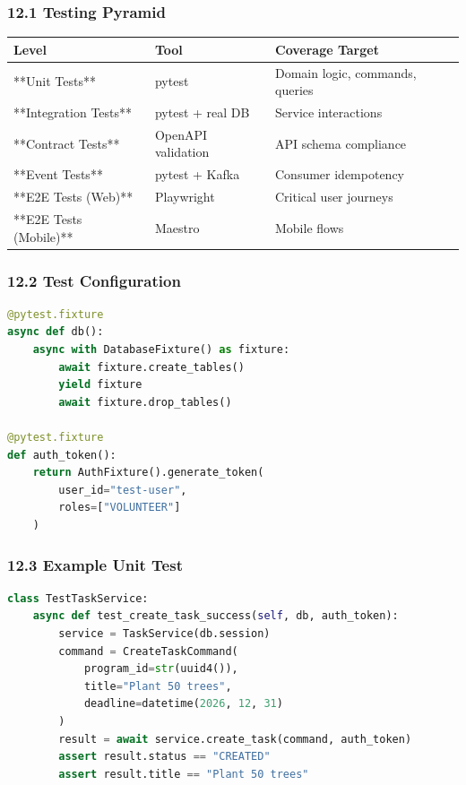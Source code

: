 \documentclass[11pt,a4paper]{article}
\begin{document}
\subsubsection{12.1 Testing Pyramid}

\begin{table}[H]
\centering
\begin{tabular}{|l|l|l|}
\hline
Level & Tool & Coverage Target \\
\hline
**Unit Tests** & pytest & Domain logic, commands, queries \\
\hline
**Integration Tests** & pytest + real DB & Service interactions \\
\hline
**Contract Tests** & OpenAPI validation & API schema compliance \\
\hline
**Event Tests** & pytest + Kafka & Consumer idempotency \\
\hline
**E2E Tests (Web)** & Playwright & Critical user journeys \\
\hline
**E2E Tests (Mobile)** & Maestro & Mobile flows \\
\hline
\end{tabular}
\end{table}


\subsubsection{12.2 Test Configuration}

\begin{lstlisting}[language=python, caption=python code]
@pytest.fixture
async def db():
    async with DatabaseFixture() as fixture:
        await fixture.create_tables()
        yield fixture
        await fixture.drop_tables()

@pytest.fixture
def auth_token():
    return AuthFixture().generate_token(
        user_id="test-user",
        roles=["VOLUNTEER"]
    )
\end{lstlisting}

\subsubsection{12.3 Example Unit Test}

\begin{lstlisting}[language=python, caption=python code]
class TestTaskService:
    async def test_create_task_success(self, db, auth_token):
        service = TaskService(db.session)
        command = CreateTaskCommand(
            program_id=str(uuid4()),
            title="Plant 50 trees",
            deadline=datetime(2026, 12, 31)
        )
        result = await service.create_task(command, auth_token)
        assert result.status == "CREATED"
        assert result.title == "Plant 50 trees"
\end{lstlisting}
\end{document}
